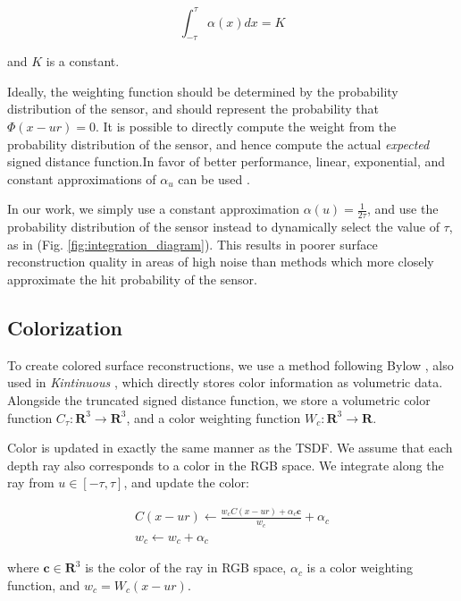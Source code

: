 \documentclass[10pt,twocolumn,letterpaper]{article}
\begin{document}
\begin{equation}
	\int_{-\tau}^{\tau} \alpha(x) dx = K 
\end{equation}
 
 \noindent and $K$ is a constant.
 
Ideally, the weighting function should be determined by the probability distribution of the sensor, and should represent
the probability that $\Phi(x - u r) = 0$. It is possible \cite{Nguyen2012} to
directly compute the weight from the probability distribution of the sensor, and hence compute
the actual \emph{expected} signed distance function.In favor of better
performance, linear, exponential, and constant approximations of $\alpha_u$ can
be used \cite{Curless1996, Newcombe, Whelan2013, Bylow2013}.

In our work, we simply use a constant approximation $\alpha(u) = \frac{1}{2
\tau}$, and use the probability distribution of the sensor instead to 
dynamically select the value of $\tau$, as in \cite{Nguyen2012} (Fig.
\ref{fig:integration_diagram}). This results in poorer surface reconstruction
quality in areas of high noise than methods which more closely approximate the
hit probability of the sensor.

\subsection{Colorization}
To create colored surface reconstructions, we use a method following Bylow
\etal \cite{Bylow2013}, also used in \textit{Kintinuous} \cite{Whelan2013},
which directly stores color information as volumetric data. Alongside the
truncated signed distance function, we store a volumetric color function
$C_\tau : \mathbf{R}^3 \to \mathbf{R}^3$, and a color weighting function $W_c :
\mathbf{R}^3 \to \mathbf{R}$.

Color is updated in exactly the same manner as the TSDF. We assume that each
depth ray also corresponds to a color in the RGB space. We integrate along the
ray from $u \in [-\tau, \tau]$, and update the color:

\begin{align}
C(x - ur) \gets \frac{w_c C(x - ur) + \alpha_c \mathbf{c}}{w_c}
+\alpha_c
\\
%
w_c \gets w_c + \alpha_c
\end{align}

\noindent where $\mathbf{c} \in \mathbf{R}^3$ is the color of the ray in RGB
space, $\alpha_c$ is a color weighting function, and $w_c = W_c(x -
ur)$.
\end{document}
